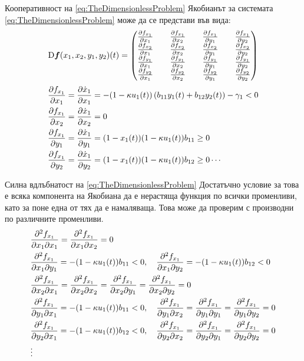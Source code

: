 \begin{frame}[t]{Кооперативност на \eqref{eq:TheDimensionlessProblem}}
  Якобианът за системата \eqref{eq:TheDimensionlessProblem} може да се представи във вида:
  \begin{equation*}
    \mathrm{D} \boldsymbol{f}(x_1, x_2, y_1, y_2)(t) =
    \begin{pmatrix}
      \pdv{f_{x_1}}{x_1} && \pdv{f_{x_1}}{x_2} && \pdv{f_{x_1}}{y_1} && \pdv{f_{x_1}}{y_2} \\
      \pdv{f_{x_2}}{x_1} && \pdv{f_{x_2}}{x_2} && \pdv{f_{x_2}}{y_1} && \pdv{f_{x_2}}{y_2} \\
      \pdv{f_{y_1}}{x_1} && \pdv{f_{y_1}}{x_2} && \pdv{f_{y_1}}{y_1} && \pdv{f_{y_1}}{y_2} \\
      \pdv{f_{y_2}}{x_1} && \pdv{f_{y_2}}{x_2} && \pdv{f_{y_2}}{y_1} && \pdv{f_{y_2}}{y_2}
    \end{pmatrix}
  \end{equation*}
  \label{eq:JacobianElements}
  \begin{equation*}
    \begin{split}
      &\pdv{f_{x_1}}{x_1} = \pdv{\dot{x}_1}{x_1} = -(1-\kappa u_1(t)) \left(b_{11} y_1(t) + b_{12} y_2(t)\right) - \gamma_1 < 0 \\
      &\pdv{f_{x_1}}{x_2} = \pdv{\dot{x}_1}{x_2} = 0 \\
      &\pdv{f_{x_1}}{y_1} = \pdv{\dot{x}_1}{y_1} = (1-x_1(t)) (1-\kappa u_1(t)) b_{11} \geq 0 \\
      &\pdv{f_{x_1}}{y_2} = \pdv{\dot{x}_1}{y_2} = (1-x_1(t)) (1-\kappa u_1(t)) b_{12} \geq 0 \cdots
      \end{split}
      \end{equation*}
      \end{frame}

      \begin{frame}[t]{Силна вдлъбнатост на \eqref{eq:TheDimensionlessProblem}}
      Достатъчно условие за това е всяка компонента на Якобиана да е нерастяща функция по всички променливи, като за поне една от тях да е намаляваща. Това може да проверим с производни по различните променливи.
      \begin{equation*}
      \begin{split}
      &\pdv{f_{x_1}}{x_1}{x_1} = \pdv{f_{x_1}}{x_1}{x_2}= 0 \\
      &\pdv{f_{x_1}}{x_1}{y_1} = -(1-\kappa u_1(t)) b_{11} < 0, \quad
      \pdv{f_{x_1}}{x_1}{y_2} = -(1-\kappa u_1(t)) b_{12} < 0 \\
      &\pdv{f_{x_1}}{x_2}{x_1} = \pdv{f_{x_1}}{x_2}{x_2} = \pdv{f_{x_1}}{x_2}{y_1} = \pdv{f_{x_1}}{x_2}{y_2} = 0 \\
      &\pdv{f_{x_1}}{y_1}{x_1} = -(1-\kappa u_1(t)) b_{11} < 0, \quad
      \pdv{f_{x_1}}{y_1}{x_2} = \pdv{f_{x_1}}{y_1}{y_1} = \pdv{f_{x_1}}{y_1}{y_2} = 0 \\
      &\pdv{f_{x_1}}{y_2}{x_1} = -(1-\kappa u_1(t)) b_{12} < 0, \quad
      \pdv{f_{x_1}}{y_2}{x_2} = \pdv{f_{x_1}}{y_2}{y_1} = \pdv{f_{x_1}}{y_2}{y_2} = 0 \\
      &\vdots
    \end{split}
  \end{equation*}
  \end{frame}

